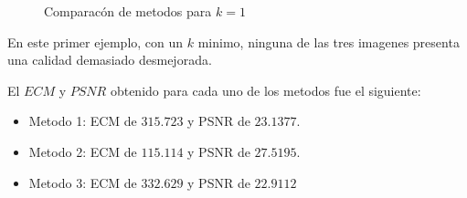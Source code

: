 \begin{figure}[H]
    \centering
    \qquad
    \qquad
    \caption{Comparacón de metodos para $k = 1$}
    \label{fig:example}
\end{figure}

En este primer ejemplo, con un $k$ minimo, ninguna de las tres imagenes presenta una calidad demasiado desmejorada. 

El $ECM$ y $PSNR$ obtenido para cada uno de los metodos fue el siguiente:
\begin{itemize}
 \item Metodo 1: ECM de $315.723$ y PSNR de $23.1377$.
 \item Metodo 2: ECM de $115.114$ y PSNR de $27.5195$.
 \item Metodo 3: ECM de $332.629$ y PSNR de $22.9112$
\end{itemize}

